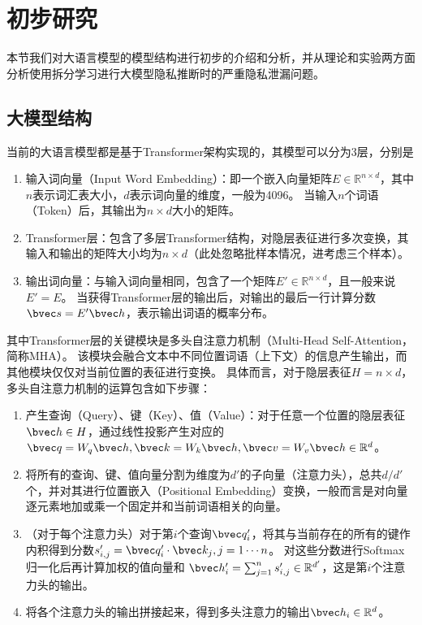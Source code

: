 \section{初步研究}
本节我们对大语言模型的模型结构进行初步的介绍和分析，并从理论和实验两方面分析使用拆分学习进行大模型隐私推断时的严重隐私泄漏问题。

\subsection{大模型结构}
当前的大语言模型都是基于Transformer架构实现的，其模型可以分为3层，分别是
\begin{enumerate}
    \item 输入词向量（Input Word Embedding）：即一个嵌入向量矩阵$E \in \mathbb R^{n\times d}$，其中$n$表示词汇表大小，$d$表示词向量的维度，一般为4096。
    当输入$n$个词语（Token）后，其输出为$n \times d$大小的矩阵。
    \item Transformer层：包含了多层Transformer结构，对隐层表征进行多次变换，其输入和输出的矩阵大小均为$n \times d$（此处忽略批样本情况，进考虑三个样本）。
    \item 输出词向量：与输入词向量相同，包含了一个矩阵$E' \in \mathbb R^{n\times d}$，且一般来说$E' = E$。
    当获得Transformer层的输出后，对输出的最后一行计算分数$\bvec  s = E'\bvec h$，表示输出词语的概率分布。
\end{enumerate}

其中Transformer层的关键模块是多头自注意力机制（Multi-Head Self-Attention，简称MHA）。
%
该模块会融合文本中不同位置词语（上下文）的信息产生输出，而其他模块仅仅对当前位置的表征进行变换。
%
具体而言，对于隐层表征$H = n\times d$，多头自注意力机制的运算包含如下步骤：
\begin{enumerate}
    \item 产生查询（Query）、键（Key）、值（Value）：对于任意一个位置的隐层表征$\bvec h \in H$，通过线性投影产生对应的$\bvec q = W_q \bvec h, \bvec k = W_k \bvec h, \bvec v = W_v \bvec h \in \mathbb R^d$。
    \item 将所有的查询、键、值向量分割为维度为$d'$的子向量（注意力头），总共$d/d'$个，并对其进行位置嵌入（Positional Embedding）变换，一般而言是对向量逐元素地加或乘一个固定并和当前词语相关的向量。
    \item （对于每个注意力头）对于第$i$个查询$\bvec q_i'$，将其与当前存在的所有的键作内积得到分数$s'_{i, j} = \bvec q_i' \cdot \bvec k_j, j = 1\cdots n$。
    对这些分数进行Softmax归一化后再计算加权的值向量和 $\bvec h'_i = \sum_{j = 1}^n s'_{i, j} \in \mathbb R^{d'}$，这是第$i$个注意力头的输出。
    \item 将各个注意力头的输出拼接起来，得到多头注意力的输出$\bvec h_i \in \mathbb R^d$。
\end{enumerate}

